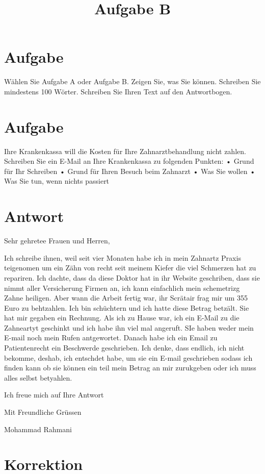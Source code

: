 \documentclass[a4paper]{article}
\title{Aufgabe B}
\date{}
\begin{document}
    \maketitle
    
    
    \section{Aufgabe}
        Wählen Sie Aufgabe A oder Aufgabe B. Zeigen Sie, was Sie können. Schreiben Sie mindestens 100 Wörter. Schreiben Sie Ihren Text auf den Antwortbogen.
    \section{Aufgabe}
        Ihre Krankenkassa will die Kosten für Ihre Zahnarztbehandlung nicht zahlen.
        Schreiben Sie ein E-Mail an Ihre Krankenkassa zu folgenden Punkten:
        • Grund für Ihr Schreiben
        • Grund für Ihren Besuch beim Zahnarzt
        • Was Sie wollen
        • Was Sie tun, wenn nichts passiert

    \section{Antwort}
    Sehr gehretee Frauen und Herren,
    
    Ich schreibe ihnen, weil seit vier Monaten habe ich in mein Zahnartz Praxis teigenomen um ein Zähn von recht seit meinem Kiefer die viel Schmerzen hat zu repariren. Ich dachte, dass da diese Doktor hat in ihr Website geschriben, dass sie nimmt aller Versicherung Firmen an, ich kann einfachlich mein schemetrizg Zahne heiligen. Aber wann die Arbeit fertig war, ihr Scrätair frag mir um 355 Euro zu behtzahlen. Ich bin schüchtern und ich hatte diese Betrag betzält. Sie hat mir gegaben ein Rechnung. Als ich zu Hause war, ich ein E-Mail zu die Zahneartyt geschinkt und ich habe ihn viel mal angeruft. SIe haben weder mein E-mail noch mein Rufen antgewortet. Danach habe ich ein Email zu Patientenrecht ein Beschwerde geschrieben. Ich denke, dass endlich, ich nicht bekomme, deshab, ich entschdet habe, um sie ein E-mail geschrieben sodass ich finden kann ob sie können ein teil mein Betrag an mir zurukgeben oder ich muss alles selbst betyahlen.
    
    Ich freue mich auf Ihre Antwort
    
    Mit Freundliche Grüssen
    
    Mohammad Rahmani
    
    \section{Korrektion}
    
\end{document}
